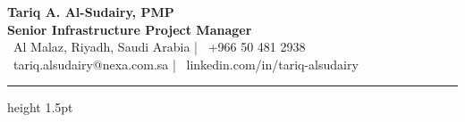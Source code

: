 \documentclass[10pt,a4paper]{article}
\begin{document}
\color{darktext}

\noindent
\begin{minipage}[b]{0.72\textwidth}
    {\Huge\bfseries\color{primary} Tariq A. Al-Sudairy, PMP} \\[0.2cm]
    {\large\bfseries\color{secondary} Senior Infrastructure Project Manager} \\[0.4cm]
    {\footnotesize
    \faMapMarker \ Al Malaz, Riyadh, Saudi Arabia \quad | \quad 
    \faPhone \ +966 50 481 2938 \\
    \faEnvelope \ tariq.alsudairy@nexa.com.sa \quad | \quad 
    \faLink \ linkedin.com/in/tariq-alsudairy
    }
\end{minipage}%
\hfill
\begin{minipage}[b]{0.22\textwidth}
    \flushright
\end{minipage}

\vspace{0.3cm}
{\color{accent}\hrule height 1.5pt}
\vspace{0.4cm}
\end{document}

